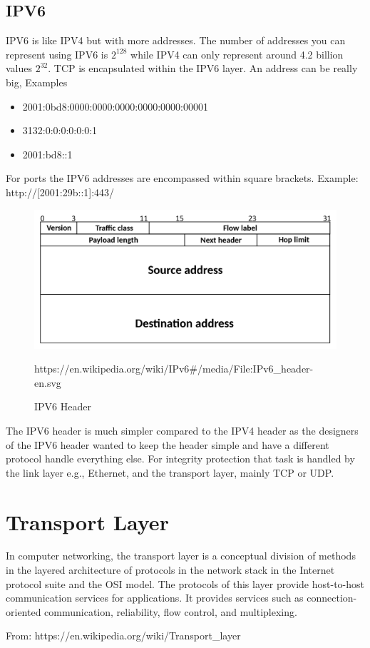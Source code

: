 \documentclass[../CMPUT-404-Notes.tex]{subfiles}
\begin{document}
\subsection{IPV6}
IPV6 is like IPV4 but with more addresses. The number of addresses you can represent using IPV6 is $2^{128}$ while IPV4 can only represent around 4.2 billion values $2^{32}$. 
TCP is encapsulated within the IPV6 layer.  
An address can be really big, Examples
\begin{itemize}
  \item 2001:0bd8:0000:0000:0000:0000:0000:00001
  \item 3132:0:0:0:0:0:0:1
  \item 2001:bd8::1
\end{itemize}
For ports the IPV6 addresses are encompassed within square brackets. Example: http://[2001:29b::1]:443/

\begin{figure}[!h]
  \centering
  \includegraphics[width=\columnwidth]{../assets/IPv6-header-en.png}
  \caption{IPV6 Header}
  https://en.wikipedia.org/wiki/IPv6\#/media/File:IPv6\_header-en.svg
\end{figure}

\begin{Note}
  The IPV6 header is much simpler compared to the IPV4 header as the designers of the IPV6 header wanted to keep the header simple and have a different protocol handle everything else. For integrity protection that task is handled by the link layer e.g., Ethernet, and the transport layer, mainly TCP or UDP. 
\end{Note}

\section{Transport Layer}
\begin{quotebox}
  In computer networking, the transport layer is a conceptual division of methods in the layered architecture of protocols in the network stack in the Internet protocol suite and the OSI model. The protocols of this layer provide host-to-host communication services for applications. It provides services such as connection-oriented communication, reliability, flow control, and multiplexing.

  From: https://en.wikipedia.org/wiki/Transport\_layer
\end{quotebox}
\end{document}

